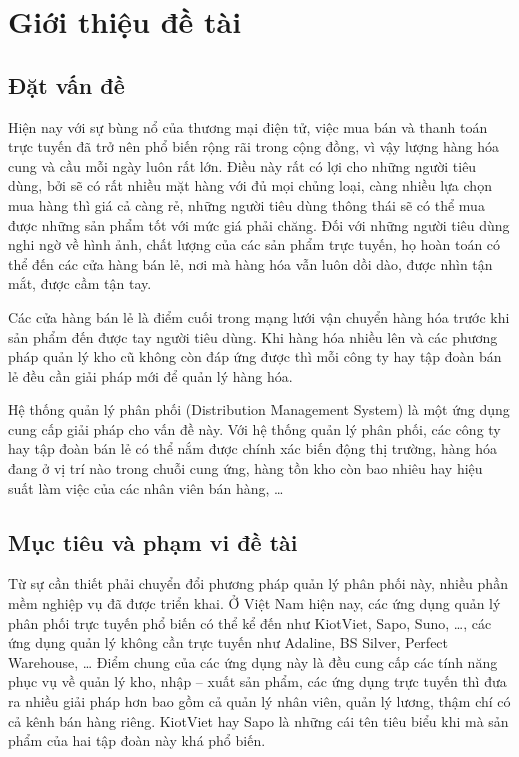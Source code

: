 \chapter{Giới thiệu đề tài}

\section{Đặt vấn đề}
Hiện nay với sự bùng nổ của thương mại điện tử,
việc mua bán và thanh toán trực tuyến đã trở nên phổ
biến rộng rãi trong cộng đồng, vì vậy lượng hàng hóa
cung và cầu mỗi ngày luôn rất lớn. Điều này rất có lợi
cho những người tiêu dùng, bởi sẽ có rất nhiều mặt hàng
với đủ mọi chủng loại, càng nhiều lựa chọn mua hàng thì giá cả càng rẻ,
những người tiêu dùng thông thái sẽ có thể mua được những sản phẩm
tốt với mức giá phải chăng. Đối với những người tiêu dùng nghi ngờ
về hình ảnh, chất lượng của các sản phẩm trực tuyến, họ hoàn toán
có thể đến các cửa hàng bán lẻ, nơi mà hàng hóa vẫn
luôn dồi dào, được nhìn tận mắt, được cầm tận tay.

Các cửa hàng bán lẻ là điểm cuối trong mạng lưới vận chuyển hàng hóa
trước khi sản phẩm đến được tay người tiêu dùng. Khi hàng hóa nhiều lên
và các phương pháp quản lý kho cũ không còn đáp ứng được thì mỗi công
ty hay tập đoàn bán lẻ đều cần giải pháp mới để quản lý hàng hóa. 

Hệ thống quản lý phân phối (Distribution Management System) là một ứng dụng
cung cấp giải pháp cho vấn đề này. Với hệ thống quản lý phân phối,
các công ty hay tập đoàn bán lẻ có thể nắm
được chính xác biến động thị trường,
hàng hóa đang ở vị trí nào trong chuỗi cung ứng, hàng tồn kho còn bao
nhiêu hay hiệu suất làm việc của các nhân viên bán hàng, …

\section{Mục tiêu và phạm vi đề tài}
Từ sự cần thiết phải chuyển đổi phương pháp quản lý phân phối này,
nhiều phần mềm nghiệp vụ đã được triển khai. Ở Việt Nam hiện nay, các ứng
dụng quản lý phân phối trực tuyến phổ biến có thể kể đến như
KiotViet, Sapo, Suno, …, các ứng dụng quản
lý không cần trực tuyến như Adaline,
BS Silver, Perfect Warehouse, … Điểm chung của các ứng dụng này là
đều cung cấp các tính năng phục vụ về quản lý kho,
nhập – xuất sản phẩm, các ứng dụng trực tuyến
thì đưa ra nhiều giải pháp hơn bao gồm cả quản lý nhân viên, quản lý lương,
thậm chí có cả kênh bán hàng riêng. KiotViet hay Sapo là những cái
tên tiêu biểu khi mà sản phẩm của hai tập đoàn này khá phổ biến.

